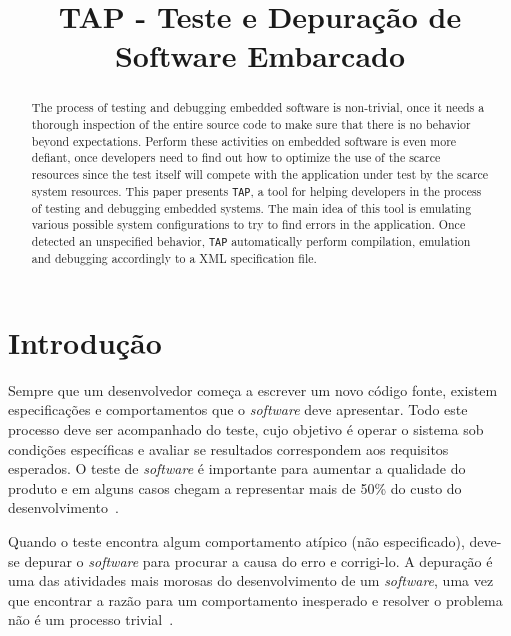 \documentclass[conference]{IEEEtran}
\begin{document}
\title{TAP - Teste e Depuração de Software Embarcado}

\author{
}
\maketitle

\begin{abstract}
The process of testing and debugging embedded software is non-trivial, once it needs a thorough inspection of the entire source code to make sure that there is no behavior beyond expectations. Perform these activities on embedded software is even more defiant, once developers need to find out how to optimize the use of the scarce resources since the test itself will compete with the application under test by the scarce system resources. This paper presents \texttt{TAP}, a tool for helping developers in the process of testing and debugging embedded systems. The main idea of this tool is emulating various possible system configurations to try to find errors in the application. Once detected an unspecified behavior, \texttt{TAP} automatically perform compilation, emulation and debugging accordingly to a XML specification file.
\end{abstract}


\section{Introdução}
Sempre que um desenvolvedor começa a escrever um novo código fonte, existem especificações e comportamentos que o \textit{software} deve apresentar. Todo este processo deve ser acompanhado do teste, cujo objetivo é operar o sistema sob condições específicas e avaliar se resultados correspondem aos requisitos esperados. O teste de \textit{software} é importante para aumentar a qualidade do produto e em alguns casos chegam a representar mais de 50\% do custo do desenvolvimento~\cite{bertolino07softwaretesting}. 

Quando o teste encontra algum comportamento atípico (não especificado), deve-se depurar o \textit{software} para procurar a causa do erro e corrigi-lo. A depuração é uma das atividades mais morosas do desenvolvimento de um \textit{software}, uma vez que encontrar a razão para um comportamento inesperado e resolver o problema não é um processo trivial~\cite{parnin2011automated}.
\end{document}
